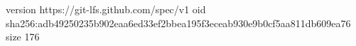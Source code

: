 version https://git-lfs.github.com/spec/v1
oid sha256:adb49250235b902eaa6ed33ef2bbea195f3eceab930e9b0cf5aa811db609ea76
size 176
